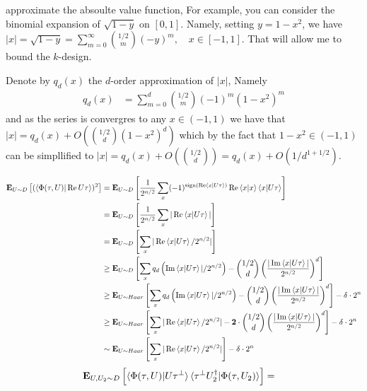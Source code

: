 \documentclass[manuscript,screen,review]{acmart}
\begin{document}
approximate the absoulte value function, For example, you can consider the
binomial expansion of $\sqrt{1-y}$ on $[0,1]$. Namely, setting $y=1-x^2$, we
have $|x|=\sqrt{1-y}=\sum_{m=0}^{\infty}\binom{1/2}{m}(-y)^m, \quad
x\in[-1,1]$. That will allow me to bound the $k$-design.

Denote by $q_{d}(x)$ the $d$-order approximation of $|x|$, Namely
\begin{equation*}
  \begin{split}
    q_{d}(x) &= \sum_{m=0}^{d}\binom{1/2}{m}(-1)^m\left( 1 - x^{2} \right)^{m}
  \end{split}
\end{equation*}
and as the series is convergres to any $x \in (-1,1)$ we have that $|x| =
q_{d}(x) + O( \binom{1/2}{d}(1-x^{2})^d )$ which by the fact that $1- x^{2}
\in (-1,1)$ can be simpllified to $|x| = q_{d}(x) + O( \binom{1/2}{d}) =
q_{d}(x) + O( 1/d^{1 +1/2})$.

\begin{equation*}
  \begin{split}
    \exppm{ ( \braket{\Phi(\tau,U)|\Rea U\tau} )^{2}  }{ U \sim D } & =
    \exppm{  \frac{1}{2^{n/2}}\sum_{x}(-1)^{\sign(\Rea \braket{x|U\tau})}\Rea
    \braket{x|x}\braket{x|U\tau}  }{ U \sim D } \\
    & = \exppm{ \frac{1}{2^{n/2}}\sum_{x}|\Rea \braket{x|U\tau}|  }{ U \sim D }
    \\
    & = \exppm{ \sum_{x}|\Rea \braket{x|U\tau} / 2^{n/2}|  }{ U \sim D } \\
    & \ge \exppm{  \sum_{x} q_{d}\left( \Ima \braket{x|U\tau}| / 2^{n/2}
      \right) - \binom{1/2}{d} \left(\frac{ | \Ima \braket{x|U\tau}|
    }{2^{n/2}}\right)^{d}}{ U \sim D } \\
    & \ge \exppm{  \sum_{x} q_{d}\left( \Ima \braket{x|U\tau}| / 2^{n/2}
      \right) - \binom{1/2}{d} \left(\frac{ | \Ima \braket{x|U\tau}|
    }{2^{n/2}}\right)^{d}}{ U \sim Haar } - \delta \cdot 2 ^{n} \\
    & \ge \exppm{  \sum_{x} |\Rea \braket{x|U\tau} / 2^{n/2}|  - \mathbf{2}
      \cdot  \binom{1/2}{d} \left(\frac{ | \Ima \braket{x|U\tau}|
    }{2^{n/2}}\right)^{d}}{ U \sim Haar } - \delta \cdot 2 ^{n} \\
    & \sim \exppm{  \sum_{x} |\Rea \braket{x|U\tau} / 2^{n/2}|}{ U \sim Haar }
    - \delta \cdot 2 ^{n}
  \end{split}
\end{equation*}
\begin{equation*}
  \begin{split}
    \exppm{  \braket{\Phi(\tau,U)|U
    \tau^{\perp}}\braket{\tau^{\perp}U_{2}^{\dagger}|\Phi(\tau,U_{2})}  }{
      U,U_{2}
    \sim D } & =
  \end{split}
\end{equation*}
\end{document}

